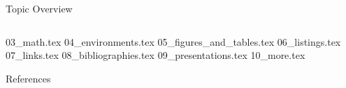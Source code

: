 



\begin{frame}[plain]{Topic Overview}
\begin{columns}[c,onlytextwidth]
\tableofcontents[sections={1-5}]
\tableofcontents[sections={6-10}]
\end{columns}
\end{frame}

{03_math.tex}
{04_environments.tex}
{05_figures_and_tables.tex}
{06_listings.tex}
{07_links.tex}
{08_bibliographies.tex}
{09_presentations.tex}
{10_more.tex}

\appendix
\beginbackup

\begin{frame}[allowframebreaks]{References}
\printbibliography
\end{frame}

\backupend


